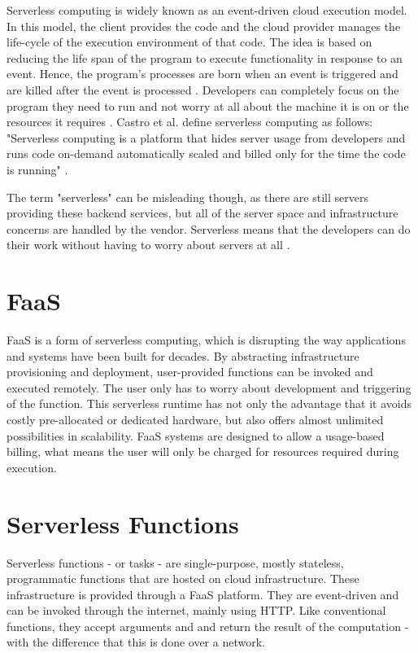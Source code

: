 \documentclass[a4paper,top=25mm,bottom=25mm,12pt,pdftex,halfparskip,twoside,bibtotoc,numbers=noenddot]{scrbook}
\begin{document}
Serverless computing is widely known as an event-driven cloud execution model.
In this model, the client provides the code  and the cloud provider manages the life-cycle of the execution environment of that code.
The idea is based on reducing the life span of the program to execute functionality in response to an event. Hence, the program's processes are born when an event is triggered and are killed after the event is processed \cite{inproceedings-serverless-beyond-the-cloud-kanso}.
Developers can completely focus on the program they need to run and not worry at all about the machine it is on or the resources it requires \cite{articles-going-serverless-savage}.
Castro et al. define serverless computing as follows: "Serverless computing is a platform that hides server usage from developers and runs code on-demand automatically scaled and billed only for the time the code is running" \cite{articles-rise-of-serverless-castro}.

The term "serverless" can be misleading though, as there are still servers providing these backend services, but all of the server space and infrastructure concerns are handled by the vendor. Serverless means that the developers can do their work without having to worry about servers at all \cite{online-what-is-serverless-cloudflare}.

\section{FaaS}

FaaS is a form of serverless computing, which is disrupting the way applications and systems have been built for decades. By abstracting infrastructure provisioning and deployment, user-provided functions can be invoked and executed remotely. The user only has to worry about development and triggering of the function. This serverless runtime has not only the advantage that it avoids costly pre-allocated or dedicated hardware, but also offers almost unlimited possibilities in scalability. FaaS systems are designed to allow a usage-based billing, what means the user will only be charged for resources required during execution.

\section{Serverless Functions}
Serverless functions - or tasks - are single-purpose, mostly stateless, programmatic functions that are hosted on cloud infrastructure. These infrastructure is provided through a FaaS platform. They are event-driven and can be invoked through the internet, mainly using HTTP. Like conventional functions, they accept arguments and and return the result of the computation  - with the difference that this is done over a network.
\end{document}

